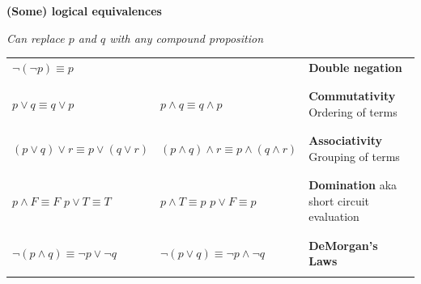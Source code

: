 
{\bf (Some) logical equivalences}

{\it Can replace $p$ and $q$ with any compound proposition}

\begin{tabular}{llp{3in}}
$\lnot ( \lnot p) \equiv p$ & & {\bf Double negation}\\
&& \\
&& \\
$p \lor q \equiv q \lor p$ & $p \land q \equiv q \land p$ & {\bf Commutativity} Ordering of terms\\
&& \\
&& \\
$(p \lor q) \lor r  \equiv p \lor (q \lor r)$ & $(p \land q) \land r  \equiv p \land (q \land r)$ & {\bf Associativity} Grouping of terms\\
&& \\
&& \\
$p \land F \equiv F$ \qquad $p \lor T \equiv T$ & $p \land T \equiv p$ \qquad $p \lor F \equiv p$ & {\bf Domination} aka 
short circuit evaluation\\
&& \\
&& \\
$\lnot (p \land q) \equiv \lnot p \lor \lnot q$ & $\lnot (p \lor q) \equiv \lnot p \land\lnot q$  & {\bf DeMorgan's Laws}\\
&& \\
\end{tabular}

